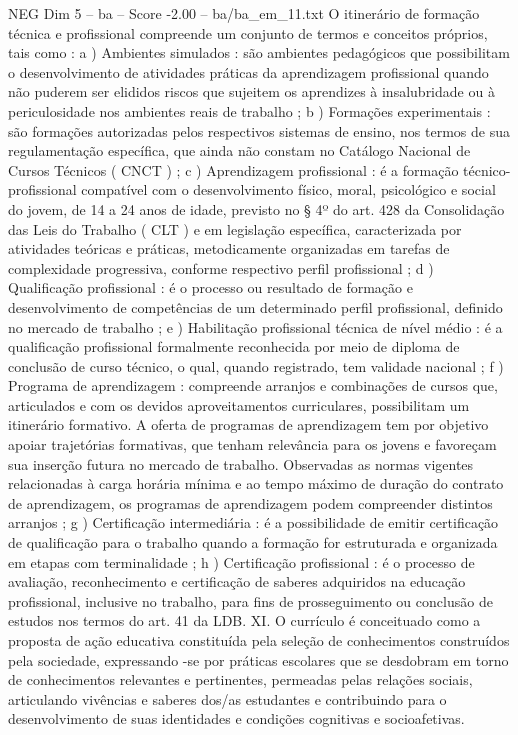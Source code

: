 \begin{textsample}{NEG Dim 5 – ba – Score -2.00 – ba/ba\_em\_11.txt}
O itinerário de formação técnica e profissional compreende um conjunto de termos e conceitos próprios, tais como : a ) Ambientes simulados : são ambientes pedagógicos que possibilitam o desenvolvimento de atividades práticas da aprendizagem profissional quando não puderem ser elididos riscos que sujeitem os aprendizes à insalubridade ou à periculosidade nos ambientes reais de trabalho ; b ) Formações experimentais : são formações autorizadas pelos respectivos sistemas de ensino, nos termos de sua regulamentação específica, que ainda não constam no Catálogo Nacional de Cursos Técnicos ( CNCT ) ; c ) Aprendizagem profissional : é a formação técnico-profissional compatível com o desenvolvimento físico, moral, psicológico e social do jovem, de 14 a 24 anos de idade, previsto no § 4º do art. 428 da Consolidação das Leis do Trabalho ( CLT ) e em legislação específica, caracterizada por atividades teóricas e práticas, metodicamente organizadas em tarefas de complexidade progressiva, conforme respectivo perfil profissional ; d ) Qualificação profissional : é o processo ou resultado de formação e desenvolvimento de competências de um determinado perfil profissional, definido no mercado de trabalho ; e ) Habilitação profissional técnica de nível médio : é a qualificação profissional formalmente reconhecida por meio de diploma de conclusão de curso técnico, o qual, quando registrado, tem validade nacional ; f ) Programa de aprendizagem : compreende arranjos e combinações de cursos que, articulados e com os devidos aproveitamentos curriculares, possibilitam um itinerário formativo.
A oferta de programas de aprendizagem tem por objetivo apoiar trajetórias formativas, que tenham relevância para os jovens e favoreçam sua inserção futura no mercado de trabalho.
Observadas as normas vigentes relacionadas à carga horária mínima e ao tempo máximo de duração do contrato de aprendizagem, os programas de aprendizagem podem compreender distintos arranjos ; g ) Certificação intermediária : é a possibilidade de emitir certificação de qualificação para o trabalho quando a formação for estruturada e organizada em etapas com terminalidade ; h ) Certificação profissional : é o processo de avaliação, reconhecimento e certificação de saberes adquiridos na educação profissional, inclusive no trabalho, para fins de prosseguimento ou conclusão de estudos nos termos do art. 41 da LDB.
XI.
O currículo é conceituado como a proposta de ação educativa constituída pela seleção de conhecimentos construídos pela sociedade, expressando -se por práticas escolares que se desdobram em torno de conhecimentos relevantes e pertinentes, permeadas pelas relações sociais, articulando vivências e saberes dos/as estudantes e contribuindo para o desenvolvimento de suas identidades e condições cognitivas e socioafetivas.

\end{textsample}
